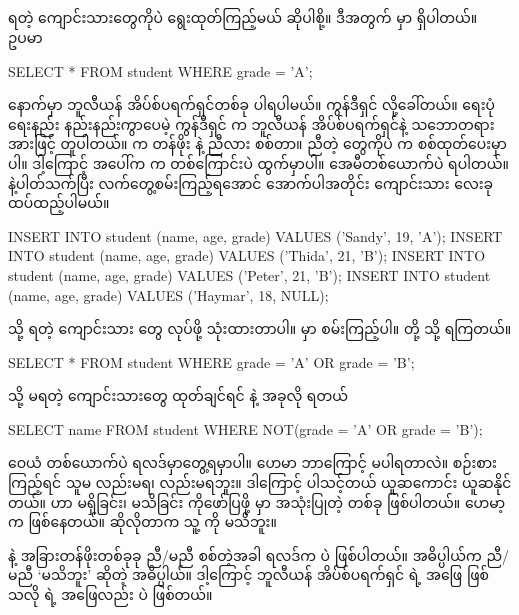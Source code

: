 \subsection*{}
 ရတဲ့ ကျောင်းသားတွေကိုပဲ ရွေးထုတ်ကြည့်မယ် ဆိုပါစို့။ ဒီအတွက်  မှာ  ရှိပါတယ်။ ဥပမာ
%
\begin{sql}
SELECT * FROM student WHERE grade = 'A';
\end{sql}
%
 နောက်မှာ ဘူလီယန် အိပ်စ်ပရက်ရှင်တစ်ခု ပါရပါမယ်။  ကွန်ဒီရှင်  လို့ခေါ်တယ်။ ရေးပုံရေးနည်း နည်းနည်းကွာပေမဲ့   ကွန်ဒီရှင် က  ဘူလီယန် အိပ်စ်ပရက်ရှင်နဲ့ သဘောတရားအားဖြင့် တူပါတယ်။  က   တန်ဖိုး  နဲ့ ညီလား စစ်တာ။ ညီတဲ့  တွေကိုပဲ  က စစ်ထုတ်ပေးမှာပါ။ ဒါ့ကြောင့် အပေါ်က  က  တစ်ကြောင်းပဲ ထွက်မှာပါ။ အေမီတစ်ယောက်ပဲ  ရပါတယ်။  နဲ့ပါတ်သက်ပြီး လက်တွေ့စမ်းကြည့်ရအောင် အောက်ပါအတိုင်း ကျောင်းသား  လေးခု ထပ်ထည့်ပါမယ်။  
%
\begin{sql}
INSERT INTO student (name, age, grade) VALUES ('Sandy', 19, 'A');
INSERT INTO student (name, age, grade) VALUES ('Thida', 21, 'B');
INSERT INTO student (name, age, grade) VALUES ('Peter', 21, 'B');
INSERT INTO student (name, age, grade) VALUES ('Haymar', 18, NULL);
\end{sql}
%

 သို့  ရတဲ့ ကျောင်းသား  တွေ  လုပ်ဖို့  သုံးထားတာပါ။  မှာ စမ်းကြည့်ပါ။  တို့  သို့  ရကြတယ်။
%
\begin{sql}
SELECT * FROM student WHERE grade = 'A' OR grade = 'B';
\end{sql}
 သို့  မရတဲ့ ကျောင်းသားတွေ ထုတ်ချင်ရင်  နဲ့ အခုလို ရတယ်
%
\begin{sql}
SELECT name FROM student WHERE NOT(grade = 'A' OR grade = 'B');
\end{sql}
ဝေယံ တစ်ယောက်ပဲ ရလဒ်မှာတွေ့ရမှာပါ။ ဟေမာ ဘာကြောင့် မပါရတာလဲ။ စဉ်းစားကြည့်ရင် သူမ  လည်းမရ၊   လည်းမရဘူး။ ဒါကြောင့်  ပါသင့်တယ် ယူဆကောင်း ယူဆနိုင်တယ်။  ဟာ မရှိခြင်း၊ မသိခြင်း ကိုဖော်ပြဖို့  မှာ အသုံးပြုတဲ့  တစ်ခု ဖြစ်ပါတယ်။ ဟေမာ့  က  ဖြစ်နေတယ်။ ဆိုလိုတာက သူ့  ကို မသိဘူး။ 

 နဲ့ အခြားတန်ဖိုးတစ်ခုခု ညီ/မညီ စစ်တဲ့အခါ ရလဒ်က  ပဲ ဖြစ်ပါတယ်။ အဓိပ္ပါယ်က ညီ/မညီ ‘မသိဘူး’ ဆိုတဲ့ အဓိပ္ပါယ်။ ဒါ့ကြောင့် ဘူလီယန် အိပ်စ်ပရက်ရှင်  ရဲ့ အဖြေ  ဖြစ်သလို  ရဲ့ အဖြေလည်း  ပဲ ဖြစ်တယ်။ 

